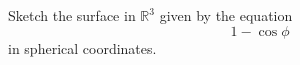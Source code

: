 \begin{problem}
Sketch the surface in $\mathbb{R}^3$ given by the equation
\[
1-\cos\phi
\]
in spherical coordinates.
\end{problem}
